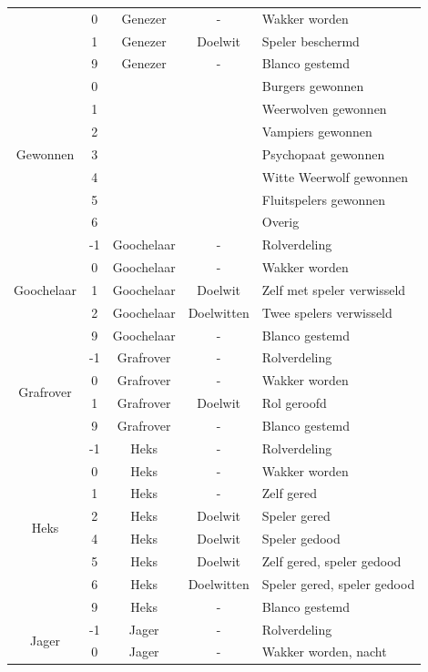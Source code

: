 \documentclass[12pt]{article}
\begin{document}
\begin{center}
\begin{longtable}{c|c|c|c|l}
       & 0 & Genezer & - & Wakker worden \\
       & 1 & Genezer & Doelwit & Speler beschermd \\
       & 9 & Genezer & - & Blanco gestemd \\
      \hline
      \multirow{7}{*}{Gewonnen} & 0 & & & Burgers gewonnen \\
       & 1 & & & Weerwolven gewonnen \\
       & 2 & & & Vampiers gewonnen \\
       & 3 & & & Psychopaat gewonnen \\
       & 4 & & & Witte Weerwolf gewonnen \\
       & 5 & & & Fluitspelers gewonnen \\
       & 6 & & & Overig \\
      \hline
      \multirow{5}{*}{Goochelaar} & -1 & Goochelaar & - & Rolverdeling \\
       & 0 & Goochelaar & - & Wakker worden \\
       & 1 & Goochelaar & Doelwit & Zelf met speler verwisseld \\
       & 2 & Goochelaar & Doelwitten & Twee spelers verwisseld \\
       & 9 & Goochelaar & - & Blanco gestemd \\
      \hline
      \multirow{4}{*}{Grafrover} & -1 & Grafrover & - & Rolverdeling \\
       & 0 & Grafrover & - & Wakker worden \\
       & 1 & Grafrover & Doelwit & Rol geroofd \\
       & 9 & Grafrover & - & Blanco gestemd \\
      \hline
      \multirow{8}{*}{Heks} & -1 & Heks & - & Rolverdeling \\
       & 0 & Heks & - & Wakker worden \\
       & 1 & Heks & - & Zelf gered \\
       & 2 & Heks & Doelwit & Speler gered \\
       & 4 & Heks & Doelwit & Speler gedood \\
       & 5 & Heks & Doelwit & Zelf gered, speler gedood \\
       & 6 & Heks & Doelwitten & Speler gered, speler gedood \\
       & 9 & Heks & - & Blanco gestemd \\
      \hline
      \multirow{8}{*}{Jager} & -1 & Jager & - & Rolverdeling \\
       & 0 & Jager & - & Wakker worden, nacht \\

\end{longtable}
\end{center}
\end{document}
